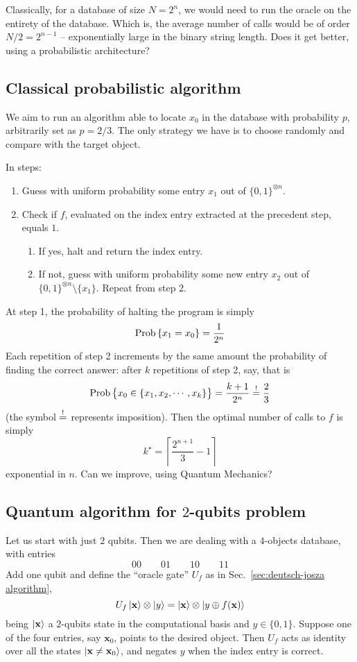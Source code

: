 Classically, for a database of size $N = 2^n$, we would need to run the oracle on the entirety of the database. Which is, the average number of calls would be of order $N/2 = 2^{n-1}$ -- exponentially large in the binary string length. Does it get better, using a probabilistic architecture?

\subsection{Classical probabilistic algorithm}

We aim to run an algorithm able to locate $x_0$ in the database with probability $p$, arbitrarily set as $p=2/3$. The only strategy we have is to choose randomly and compare with the target object.

In steps:
\begin{enumerate}
    \item Guess with uniform probability some entry $x_1$ out of $\lbrace 0,1 \rbrace^{\otimes n}$.
    \item Check if $f$, evaluated on the index entry extracted at the precedent step, equals $1$.
    \begin{enumerate}
        \item If yes, halt and return the index entry.
        \item If not, guess with uniform probability some new entry $x_2$ out of $\lbrace 0,1 \rbrace^{\otimes n} \setminus \lbrace x_1 \rbrace$. Repeat from step 2.
    \end{enumerate}
\end{enumerate}

At step 1, the probability of halting the program is simply
\[
    \mathrm{Prob}\left\lbrace x_1 = x_0 \right\rbrace = \frac{1}{2^n}
\]
Each repetition of step 2 increments by the same amount the probability of finding the correct answer: after $k$ repetitions of step 2, say, that is
\[
    \mathrm{Prob}\left\lbrace \vphantom{A^A} x_0 \in \lbrace x_1, x_2, \cdots , x_k \rbrace \right\rbrace = \frac{k+1}{2^n} \stackrel{!}{=} \frac{2}{3}
\]
(the symbol $\stackrel{!}{=}$ represents imposition). Then the optimal number of calls to $f$ is simply
\[
    k^\star = \left\lceil \frac{2^{n+1}}{3} - 1 \right\rceil
\]
exponential in $n$. Can we improve, using Quantum Mechanics?

\subsection{Quantum algorithm for $2$-qubits problem}

Let us start with just $2$ qubits. Then we are dealing with a $4$-objects database, with entries
\[
    00 \qquad 01 \qquad 10 \qquad 11
\]
Add one qubit and define the ``oracle gate'' $U_f$ as in Sec.~\ref{sec:deutsch-josza algorithm},
\[
    U_f \ket{\mathbf{x}} \otimes \ket{y} = \ket{\mathbf{x}} \otimes \ket{y \oplus f(\mathbf{x})}
\]
being $\ket{\mathbf{x}}$ a $2$-qubits state in the computational basis and $y \in \lbrace 0,1 \rbrace$. Suppose one of the four entries, say $\mathbf{x}_0$, points to the desired object. Then $U_f$ acts as identity over all the states $\ket{\mathbf{x} \neq \mathbf{x}_0}$, and negates $y$ when the index entry is correct.

